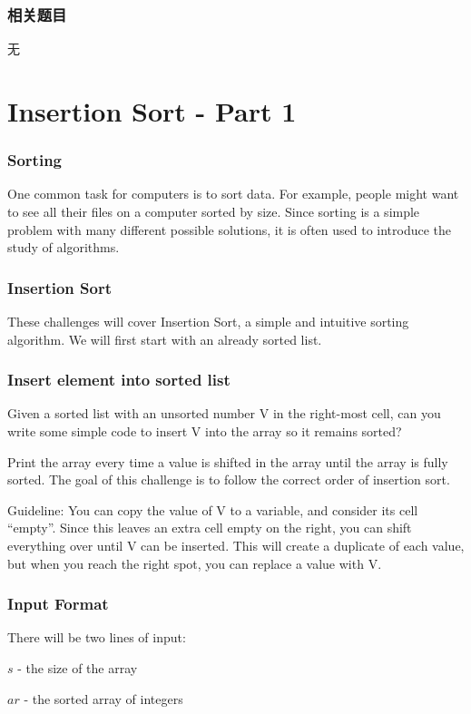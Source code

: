 \subsubsection{相关题目}
\begindot
\item 无
\myenddot


\section{Insertion Sort - Part 1} %
\label{sec:Insertion-Sort-Part-1}


\subsubsection{Sorting}
One common task for computers is to sort data. For example, people might want to see all their files on a computer sorted by size. Since sorting is a simple problem with many different possible solutions, it is often used to introduce the study of algorithms.

\subsubsection{Insertion Sort}
These challenges will cover Insertion Sort, a simple and intuitive sorting algorithm. We will first start with an already sorted list.

\subsubsection{Insert element into sorted list}
Given a sorted list with an unsorted number V in the right-most cell, can you write some simple code to insert V into the array so it remains sorted?

Print the array every time a value is shifted in the array until the array is fully sorted. The goal of this challenge is to follow the correct order of insertion sort.

Guideline: You can copy the value of V to a variable, and consider its cell “empty”. Since this leaves an extra cell empty on the right, you can shift everything over until V can be inserted. This will create a duplicate of each value, but when you reach the right spot, you can replace a value with V.


\subsubsection{Input Format}
There will be two lines of input:
\begindot
\item $s$ - the size of the array
\item $ar$ - the sorted array of integers
\myenddot


